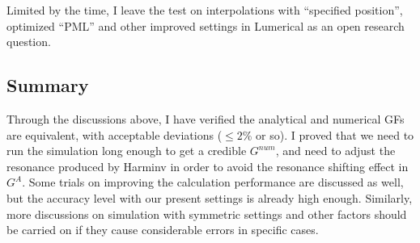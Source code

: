 Limited by the time, I leave the test on interpolations with ``specified position'', optimized ``PML'' and other improved settings in Lumerical as an open research question.

\subsection{Summary}
Through the discussions above, I have verified the analytical and numerical GFs are equivalent, with acceptable deviations ($\leq 2\%$ or so). I proved that we need to run the simulation long enough to get a credible $G^{num}$, and need to adjust the resonance produced by Harminv in order to avoid the resonance shifting effect in $G^{A}$. Some trials on improving the calculation performance are discussed as well, but the accuracy level with our present settings is already high enough. Similarly, more discussions on simulation with symmetric settings and other factors should be carried on if they cause considerable errors in specific cases.
